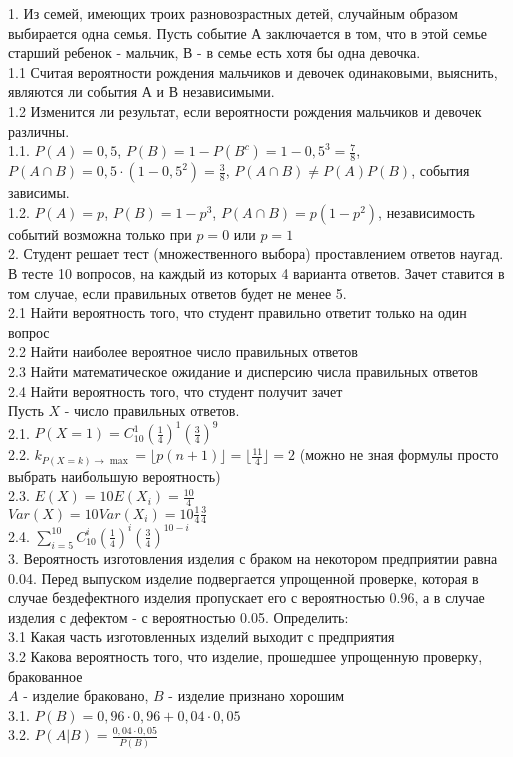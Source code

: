 \documentclass[pdftex,12pt,a4paper]{article}
\begin{document}
1.  Из семей, имеющих троих разновозрастных детей, случайным
образом выбирается одна семья. Пусть событие А заключается в том,
что в этой семье
старший ребенок - мальчик, В - в семье есть хотя бы одна девочка. \\
1.1 Считая вероятности рождения мальчиков и девочек одинаковыми,
выяснить, являются ли события А и В независимыми. \\
1.2 Изменится ли результат, если вероятности рождения мальчиков и
девочек различны. \\
1.1. $P(A)=0,5$, $P(B)=1-P(B^{c})=1-0,5^{3}=\frac{7}{8}$, $P(A\cap
B)=0,5\cdot (1-0,5^{2})=\frac{3}{8}$, $P(A\cap B)\neq P(A)P(B)$,
события зависимы. \\
1.2. $P(A)=p$, $P(B)=1-p^{3}$, $P(A\cap B)=p(1-p^{2})$,
независимость событий возможна только при $p=0$ или $p=1$ \\

2.  Студент решает тест (множественного выбора) проставлением
ответов наугад. В тесте 10 вопросов, на каждый из которых 4
варианта ответов. Зачет ставится в том случае, если правильных
ответов будет не менее 5. \\
2.1 Найти вероятность того, что студент правильно ответит только
на один вопрос \\
2.2 Найти наиболее вероятное число правильных ответов \\
2.3 Найти математическое ожидание и дисперсию числа правильных
ответов \\
2.4 Найти вероятность того, что студент получит зачет \\
Пусть $X$ - число правильных ответов. \\
2.1. $P(X=1)=C_{10}^{1}\left(\frac{1}{4}\right)^{1}\left(\frac{3}{4}\right)^{9}$ \\
2.2. $k_{P(X=k)\rightarrow \max}=\lfloor p(n+1)\rfloor=\lfloor
\frac{11}{4}\rfloor=2$ (можно не зная формулы просто выбрать
наибольшую вероятность) \\
2.3. $E(X)=10E(X_{i})=\frac{10}{4}$ \\
$Var(X)=10Var(X_{i})=10\frac{1}{4}\frac{3}{4}$ \\
2.4.
$\sum_{i=5}^{10}C_{10}^{i}\left(\frac{1}{4}\right)^{i}\left(\frac{3}{4}\right)^{10-i}$
\\

3.  Вероятность изготовления изделия с браком на некотором
предприятии равна 0.04. Перед выпуском изделие подвергается
упрощенной проверке, которая в случае бездефектного изделия
пропускает его с вероятностью 0.96, а в случае изделия с дефектом
- с вероятностью 0.05. Определить: \\
3.1 Какая часть изготовленных изделий выходит с предприятия \\
3.2 Какова вероятность того, что изделие, прошедшее упрощенную
проверку, бракованное \\
$A$ - изделие браковано, $B$ - изделие признано хорошим \\
3.1. $P(B)=0,96\cdot 0,96+0,04\cdot 0,05$ \\
3.2. $P(A|B)=\frac{0,04\cdot 0,05}{P(B)}$ \\
\end{document}

